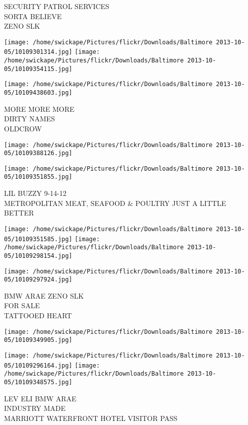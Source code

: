 \documentclass[10pt,letterpaper]{article}
\begin{document}
SECURITY PATROL SERVICES\\
SORTA BELIEVE\\
ZENO SLK\\
\pagebreak

\texttt{[image: /home/swickape/Pictures/flickr/Downloads/Baltimore 2013-10-05/10109301314.jpg]}
\texttt{[image: /home/swickape/Pictures/flickr/Downloads/Baltimore 2013-10-05/10109354115.jpg]}

\texttt{[image: /home/swickape/Pictures/flickr/Downloads/Baltimore 2013-10-05/10109438603.jpg]}

MORE MORE MORE\\
DIRTY NAMES\\
OLDCROW\\
\pagebreak

\texttt{[image: /home/swickape/Pictures/flickr/Downloads/Baltimore 2013-10-05/10109388126.jpg]}

\vspace{0.25in}
\texttt{[image: /home/swickape/Pictures/flickr/Downloads/Baltimore 2013-10-05/10109351855.jpg]}

LIL BUZZY 9{-}14{-}12\\
METROPOLITAN MEAT, SEAFOOD \& POULTRY JUST A LITTLE BETTER\\
\pagebreak

\texttt{[image: /home/swickape/Pictures/flickr/Downloads/Baltimore 2013-10-05/10109351585.jpg]}
\texttt{[image: /home/swickape/Pictures/flickr/Downloads/Baltimore 2013-10-05/10109298154.jpg]}

\texttt{[image: /home/swickape/Pictures/flickr/Downloads/Baltimore 2013-10-05/10109297924.jpg]}

BMW ARAE ZENO SLK\\
FOR SALE\\
TATTOOED HEART\\
\pagebreak

\texttt{[image: /home/swickape/Pictures/flickr/Downloads/Baltimore 2013-10-05/10109349905.jpg]}

\vspace{0.25in}
\texttt{[image: /home/swickape/Pictures/flickr/Downloads/Baltimore 2013-10-05/10109296164.jpg]}
\texttt{[image: /home/swickape/Pictures/flickr/Downloads/Baltimore 2013-10-05/10109348575.jpg]}

LEV ELI BMW ARAE\\
INDUSTRY MADE\\
MARRIOTT WATERFRONT HOTEL VISITOR PASS\\
\pagebreak
\end{document}
